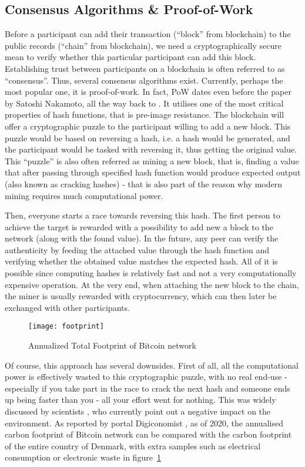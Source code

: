 \subsection{Consensus Algorithms \& Proof-of-Work}
Before a participant can add their transaction (``block'' from blockchain) to the public records (``chain'' from blockchain), we need a cryptographically secure mean to verify whether this particular participant can add this block. Establishing trust between participants on a blockchain is often referred to as ``consensus''. Thus, several consensus algorithms exist. Currently, perhaps the most popular one, it is proof-of-work. In fact, PoW dates even before the paper by Satoshi Nakamoto, all the way back to \citet{jakobsson1999proofs}. It utilises one of the most critical properties of hash functions, that is pre-image resistance. The blockchain will offer a cryptographic puzzle to the participant willing to add a new block. This puzzle would be based on reversing a hash, i.e. a hash would be generated, and the participant would be tasked with reversing it, thus getting the original value. This ``puzzle'' is also often referred as mining a new block, that is, finding a value that after passing through specified hash function would produce expected output (also known as cracking hashes) - that is also part of the reason why modern mining requires much computational power. 

Then, everyone starts a race towards reversing this hash. The first person to achieve the target is rewarded with a possibility to add new a block to the network (along with the found value). In the future, any peer can verify the authenticity by feeding the attached value through the hash function and verifying whether the obtained value matches the expected hash. All of it is possible since computing hashes is relatively fast and not a very computationally expensive operation. At the very end, when attaching the new block to the chain, the miner is usually rewarded with cryptocurrency, which can then later be exchanged with other participants.

\begin{figure}[ht]
    \centering
    \texttt{[image: footprint]}
    \caption{Annualized Total Footprint of Bitcoin network \cite{index2017digiconomist}}
    \label{fig:footprint}
\end{figure}

Of course, this approach has several downsides. First of all, all the computational power is effectively wasted to this cryptographic puzzle, with no real end-use - especially if you take part in the race to crack the next hash and someone ends up being faster than you - all your effort went for nothing. This was widely discussed by scientists \cite{gervais2016security}, who currently point out a negative impact on the environment. As reported by portal Digiconomist \cite{index2017digiconomist}, as of 2020, the annualised carbon footprint of Bitcoin network can be compared with the carbon footprint of the entire country of Denmark, with extra samples such as electrical consumption or electronic waste in figure~\ref{fig:footprint}

